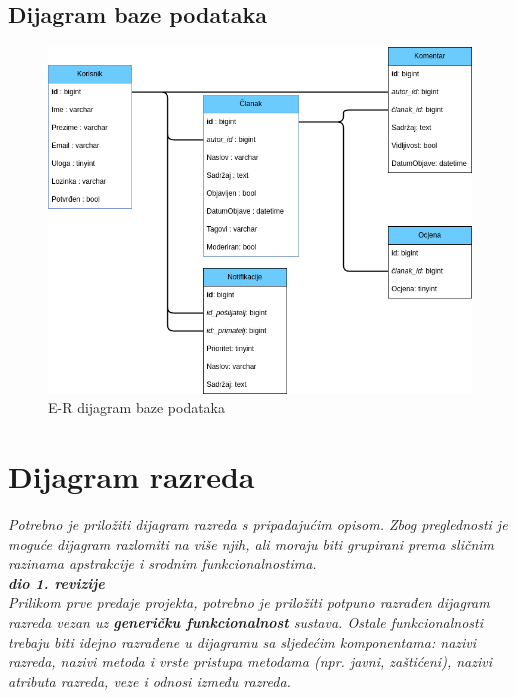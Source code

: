 				
			
			\subsection{Dijagram baze podataka}
					\begin{figure}[H]
					\includegraphics[scale=0.5]{slike/baza.png}
					\centering
					\caption{E-R dijagram baze podataka}
					\label{fig:baza}
				\end{figure}
		
			\eject
			
			
		\section{Dijagram razreda}
		
			\textit{Potrebno je priložiti dijagram razreda s pripadajućim opisom. Zbog preglednosti je moguće dijagram razlomiti na više njih, ali moraju biti grupirani prema sličnim razinama apstrakcije i srodnim funkcionalnostima.}\\
			
			\textbf{\textit{dio 1. revizije}}\\
			
			\textit{Prilikom prve predaje projekta, potrebno je priložiti potpuno razrađen dijagram razreda vezan uz \textbf{generičku funkcionalnost} sustava. Ostale funkcionalnosti trebaju biti idejno razrađene u dijagramu sa sljedećim komponentama: nazivi razreda, nazivi metoda i vrste pristupa metodama (npr. javni, zaštićeni), nazivi atributa razreda, veze i odnosi između razreda.}\\
			
